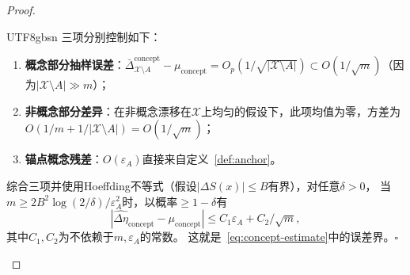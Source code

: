 \documentclass[12pt,a4paper]{article}
\newcommand{\cX}{\mathcal{X}}
\begin{document}
\begin{proof}
\begin{CJK}{UTF8}{gbsn}
三项分别控制如下：
\begin{enumerate}
\item \textbf{概念部分抽样误差}：$\bar\Delta^{\text{concept}}_{\cX\setminus A} - \mu_{\text{concept}} = O_p(1/\sqrt{|\cX\setminus A|}) \subset O(1/\sqrt{m})$（因为$|\cX\setminus A| \gg m$）；
\item \textbf{非概念部分差异}：在非概念漂移在$\cX$上均匀的假设下，此项均值为零，方差为$O(1/m + 1/|\cX\setminus A|) = O(1/\sqrt{m})$；
\item \textbf{锚点概念残差}：$O(\varepsilon_A)$直接来自定义~\ref{def:anchor}。
\end{enumerate}

综合三项并使用Hoeffding不等式（假设$|\Delta S(x)|\le B$有界），对任意$\delta>0$，
当$m \ge 2B^2\log(2/\delta)/\varepsilon_A^2$时，以概率$\ge 1-\delta$有
\[
|\widehat{\Delta\eta}_{\text{concept}} - \mu_{\text{concept}}|
\le C_1\varepsilon_A + C_2/\sqrt{m},
\]
其中$C_1, C_2$为不依赖于$m, \varepsilon_A$的常数。
这就是~\eqref{eq:concept-estimate}中的误差界。$\square$

\end{CJK}
\end{proof}
\end{document}
